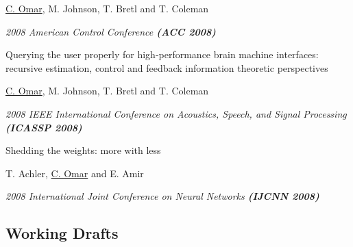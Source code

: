 \documentclass[10pt,letterpaper]{article}
\renewenvironment{itemize}{
  \begin{list}{}{
    \setlength{\leftmargin}{1.5em}
    \setlength{\itemsep}{0.25em}
    \setlength{\parskip}{0pt}
    \setlength{\parsep}{0.25em}
  }
}{
  \end{list}
}
\begin{document}
\begin{enumerate}[resume]
  \begin{itemize}
    \item \underline{C. Omar}, M. Johnson, T. Bretl and T. Coleman
    \item \textit{2008 American Control Conference \textbf{(ACC 2008)}}
  \end{itemize}
\item Querying the user properly for high-performance brain machine interfaces: recursive estimation, control and feedback information theoretic perspectives
  \begin{itemize}
    \item \underline{C. Omar}, M. Johnson, T. Bretl and T. Coleman
    \item \textit{2008 IEEE International Conference on Acoustics, Speech, and Signal Processing \textbf{(ICASSP 2008)}}
  \end{itemize}
\item Shedding the weights: more with less
  \begin{itemize}
    \item T. Achler, \underline{C. Omar} and E. Amir
    \item \textit{2008 International Joint Conference on Neural Networks \textbf{(IJCNN 2008)}}
  \end{itemize}
\end{enumerate}

\subsection*{Working Drafts}
\end{document}

